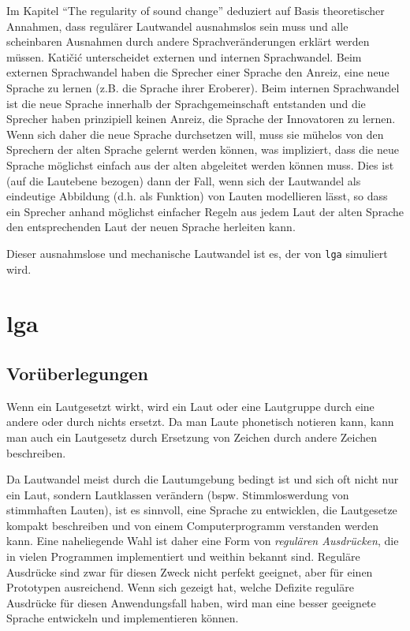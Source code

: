 \documentclass[12pt,a4paper,normalheadings,bibliography=totoc]{scrartcl}
\def\tt#1{\texttt{#1}}
\begin{document}
Im Kapitel ``The regularity of sound change'' deduziert \textcite{katicic}
auf Basis theoretischer Annahmen,
dass regulärer Lautwandel ausnahmslos sein muss
und alle scheinbaren Ausnahmen durch andere Sprachveränderungen
erklärt werden müssen.
Katičić unterscheidet externen und internen Sprachwandel.
Beim externen Sprachwandel haben die Sprecher einer Sprache den Anreiz,
eine neue Sprache zu lernen (z.B. die Sprache ihrer Eroberer).
Beim internen Sprachwandel
ist die neue Sprache innerhalb der Sprachgemeinschaft entstanden und
die Sprecher haben prinzipiell keinen Anreiz,
die Sprache der Innovatoren zu lernen.
Wenn sich daher die neue Sprache durchsetzen will,
muss sie mühelos von den Sprechern der alten Sprache gelernt werden können,
was impliziert,
dass die neue Sprache möglichst einfach aus der alten abgeleitet werden können muss.
Dies ist (auf die Lautebene bezogen) dann der Fall,
wenn sich der Lautwandel als eindeutige Abbildung (d.h. als Funktion)
von Lauten modellieren lässt,
so dass ein Sprecher anhand möglichst einfacher Regeln
aus jedem Laut der alten Sprache den entsprechenden Laut der neuen Sprache
herleiten kann.

Dieser ausnahmslose und mechanische Lautwandel ist es,
der von \tt{lga} simuliert wird.

\section{lga}

\subsection{Vorüberlegungen}

Wenn ein Lautgesetzt wirkt,
wird ein Laut oder eine Lautgruppe durch eine andere oder durch nichts ersetzt.
Da man Laute phonetisch notieren kann,
kann man auch ein Lautgesetz durch Ersetzung
von Zeichen durch andere Zeichen beschreiben.

Da Lautwandel meist durch die Lautumgebung bedingt ist
und sich oft nicht nur ein Laut, sondern Lautklassen verändern
(bspw. Stimmloswerdung von stimmhaften Lauten),
ist es sinnvoll,
eine Sprache zu entwicklen,
die Lautgesetze kompakt beschreiben
und von einem Computerprogramm verstanden werden kann.
Eine naheliegende Wahl ist daher eine Form von \emph{regulären Ausdrücken},
die in vielen Programmen implementiert und weithin bekannt sind.
Reguläre Ausdrücke sind zwar für diesen Zweck nicht perfekt geeignet,
aber für einen Prototypen ausreichend.
Wenn sich gezeigt hat,
welche Defizite reguläre Ausdrücke für diesen Anwendungsfall haben,
wird man eine besser geeignete Sprache entwickeln und implementieren können.
\end{document}
